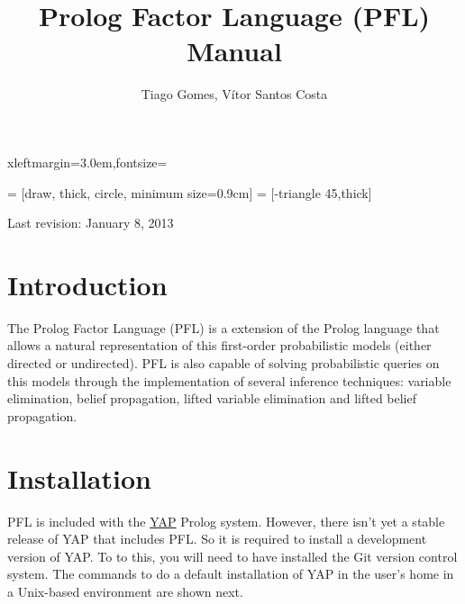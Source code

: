 \documentclass{article}
\begin{document}
 {xleftmargin=3.0em,fontsize=\small}

\newenvironment{pflcode}
  {\VerbatimEnvironment \setstretch{0.8} \begin{pflcodeve}}
  {\end{pflcodeve} }

\newcommand{\true}      {\mathtt{t}}
\newcommand{\false}     {\mathtt{f}}
\newcommand{\tableline} {\noalign{\hrule height 0.8pt}}

   = [draw, thick, circle, minimum size=0.9cm]
 = [-triangle 45,thick]

\setlength{\parskip}{\baselineskip}

\title{\Huge\textbf{Prolog Factor Language (PFL) Manual}}
\author{Tiago Gomes, V\'{i}tor Santos Costa}
\date{}

\maketitle
\thispagestyle{empty}
\vspace{5cm}
\begin{center}
  \large Last revision: January 8, 2013
\end{center}
\newpage

\section{Introduction}
The Prolog Factor Language (PFL) is a extension of the Prolog language that allows a natural representation of this first-order probabilistic models (either directed or undirected). PFL is also capable of solving probabilistic  queries on this models through the implementation of several inference techniques: variable elimination, belief propagation, lifted variable elimination and lifted belief propagation.


\section{Installation}
PFL is included with the \href{http://www.dcc.fc.up.pt/~vsc/Yap/}{YAP} Prolog system. However, there isn't yet a stable release of YAP that includes PFL. So it is required to install a development version of YAP. To to this, you will need to have installed the Git version control system. The commands to do a default installation of YAP in the user's home in a Unix-based environment are shown next.
\end{document}
